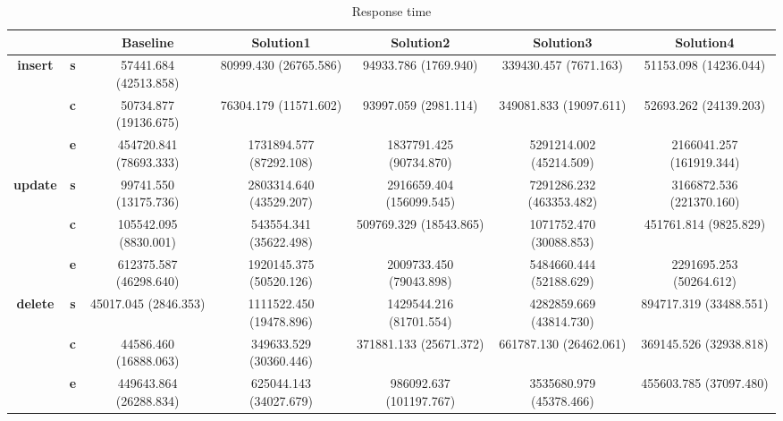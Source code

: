\begin{table}[h]
\centering
\caption{Response time}\label{t:}
\begin{tabular}{ccccccc}
\toprule
&&\textbf{Baseline} & \textbf{Solution1} & \textbf{Solution2} & \textbf{Solution3} & \textbf{Solution4}\\
\midrule
\multirow{3}{*}{\textbf{insert}} & \textbf{s} & 57441.684 (42513.858) & 80999.430 (26765.586) & 94933.786 (1769.940) & 339430.457 (7671.163) & 51153.098 (14236.044)\\
 & \textbf{c} & 50734.877 (19136.675) & 76304.179 (11571.602) & 93997.059 (2981.114) & 349081.833 (19097.611) & 52693.262 (24139.203)\\
 & \textbf{e} & 454720.841 (78693.333) & 1731894.577 (87292.108) & 1837791.425 (90734.870) & 5291214.002 (45214.509) & 2166041.257 (161919.344)\\
\midrule
\multirow{3}{*}{\textbf{update}} & \textbf{s} & 99741.550 (13175.736) & 2803314.640 (43529.207) & 2916659.404 (156099.545) & 7291286.232 (463353.482) & 3166872.536 (221370.160)\\
 & \textbf{c} & 105542.095 (8830.001) & 543554.341 (35622.498) & 509769.329 (18543.865) & 1071752.470 (30088.853) & 451761.814 (9825.829)\\
 & \textbf{e} & 612375.587 (46298.640) & 1920145.375 (50520.126) & 2009733.450 (79043.898) & 5484660.444 (52188.629) & 2291695.253 (50264.612)\\
\midrule
\multirow{3}{*}{\textbf{delete}} & \textbf{s} & 45017.045 (2846.353) & 1111522.450 (19478.896) & 1429544.216 (81701.554) & 4282859.669 (43814.730) & 894717.319 (33488.551)\\
 & \textbf{c} & 44586.460 (16888.063) & 349633.529 (30360.446) & 371881.133 (25671.372) & 661787.130 (26462.061) & 369145.526 (32938.818)\\
 & \textbf{e} & 449643.864 (26288.834) & 625044.143 (34027.679) & 986092.637 (101197.767) & 3535680.979 (45378.466) & 455603.785 (37097.480)\\
\bottomrule
\end{tabular}
\end{table}



